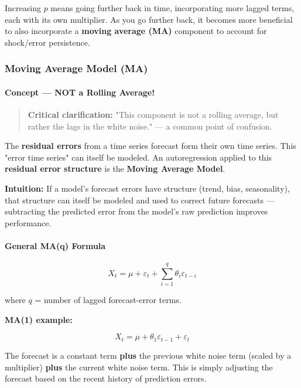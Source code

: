\documentclass[12pt,openany]{book}
\begin{document}
Increasing \(p\) means going further back in time, incorporating more lagged terms, each with its own multiplier. As you go further back, it becomes more beneficial to also incorporate a \textbf{moving average (MA)} component to account for shock/error persistence.

\subsubsection{Moving Average Model (MA)}

\paragraph{Concept --- NOT a Rolling Average!}

\begin{quote}
\textbf{Critical clarification:} "This component is not a rolling average, but rather the lags in the white noise." --- a common point of confusion.\par

\end{quote}

The \textbf{residual errors} from a time series forecast form their own time series. This "error time series" can itself be modeled. An autoregression applied to this \textbf{residual error structure} is the \textbf{Moving Average Model}.

\textbf{Intuition:} If a model's forecast errors have structure (trend, bias, seasonality), that structure can itself be modeled and used to correct future forecasts --- subtracting the predicted error from the model's raw prediction improves performance.

\paragraph{General MA(q) Formula}

\begin{equation*}
    X_t = \mu + \varepsilon_t + \sum_{i=1}^{q} \theta_i \varepsilon_{t-i}
\end{equation*}

where \(q\) = number of lagged forecast-error terms.

\textbf{MA(1) example:}

\begin{equation*}
    X_t = \mu + \theta_1 \varepsilon_{t-1} + \varepsilon_t
\end{equation*}

The forecast is a constant term \textbf{plus} the previous white noise term (scaled by a multiplier) \textbf{plus} the current white noise term. This is simply adjusting the forecast based on the recent history of prediction errors.
\end{document}
